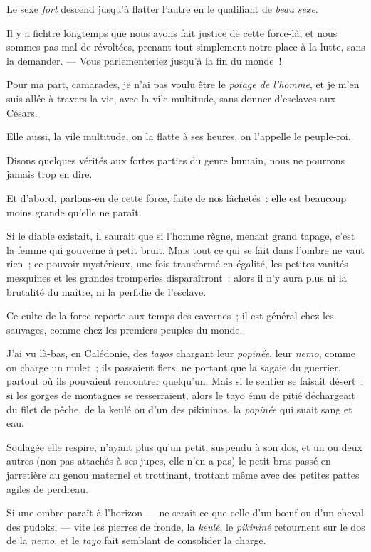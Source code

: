 \documentclass[french,twoside]{book} %
\begin{document}
Le sexe \emph{fort} descend jusqu’à flatter l’autre en le qualifiant de \emph{beau sexe}.\par
Il y a fichtre longtemps que nous avons fait justice de cette force-là, et nous sommes  pas mal de révoltées, prenant tout simplement notre place à la lutte, sans la demander. — Vous parlementeriez jusqu’à la fin du monde !\par
Pour ma part, camarades, je n’ai pas voulu être le \emph{potage de l’homme}, et je m’en suis allée à travers la vie, avec la vile multitude, sans donner d’esclaves aux Césars.\par
Elle aussi, la vile multitude, on la flatte à ses heures, on l’appelle le peuple-roi.\par
Disons quelques vérités aux fortes parties du genre humain, nous ne pourrons jamais trop en dire.\par
Et d’abord, parlons-en de cette force, faite de nos lâchetés : elle est beaucoup moins grande qu’elle ne paraît.\par
Si le diable existait, il saurait que si l’homme règne, menant grand tapage, c’est la femme qui gouverne à petit bruit. Mais tout ce qui se fait dans l’ombre ne vaut rien ; ce pouvoir mystérieux, une fois transformé en égalité, les petites vanités mesquines et les grandes tromperies disparaîtront ; alors il n’y aura plus ni la brutalité du maître, ni la perfidie de l’esclave.\par
Ce culte de la force reporte aux temps des cavernes ; il est général chez les sauvages, comme chez les premiers peuples du monde.\par
J’ai vu là-bas, en Calédonie, des \emph{tayos} chargant  leur \emph{popinée}, leur \emph{nemo}, comme on charge un mulet ; ils passaient fiers, ne portant que la sagaie du guerrier, partout où ils pouvaient rencontrer quelqu’un. Mais si le sentier se faisait désert ; si les gorges de montagnes se resserraient, alors le tayo ému de pitié déchargeait du filet de pêche, de la keulé ou d’un des pikininos, la \emph{popinée} qui suait sang et eau.\par
Soulagée elle respire, n’ayant plus qu’un petit, suspendu à son dos, et un ou deux autres (non pas attachés à ses jupes, elle n’en a pas) le petit bras passé en jarretière au genou maternel et trottinant, trottant même avec des petites pattes agiles de perdreau.\par
Si une ombre paraît à l’horizon — ne serait-ce que celle d’un bœuf ou d’un cheval des pudoks, — vite les pierres de fronde, la \emph{keulé}, le \emph{pikininé} retournent sur le dos de la \emph{nemo}, et le \emph{tayo} fait semblant de consolider la charge.\par
\end{document}
